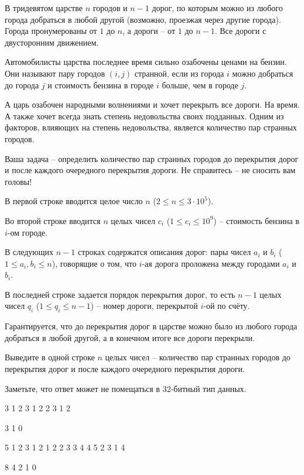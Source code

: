 
В тридевятом царстве $n$ городов и $n - 1$ дорог, по которым можно из любого города добраться в любой другой (возможно, проезжая через другие города). Города пронумерованы от $1$ до $n$, а дороги -- от $1$ до $n - 1$. Все дороги с двусторонним движением.

Автомобилисты царства последнее время сильно озабочены ценами на бензин. Они называют пару городов $(i, j)$ странной, если из города $i$ можно добраться до города $j$ и стоимость бензина в городе $i$ больше, чем в городе $j$.

А царь озабочен народными волнениями и хочет перекрыть все дороги. На время. А также хочет всегда знать степень недовольства своих подданных. Одним из факторов, влияющих на степень недовольства, является количество пар странных городов.

Ваша задача -- определить количество пар странных городов до перекрытия дорог и после каждого очередного перекрытия дороги. Не справитесь -- не сносить вам головы!


В первой строке вводится целое число $n$ ($2 \le n \le 3 \cdot 10^5$).

Во второй строке вводится $n$ целых чисел $c_i$ ($1 \le c_i \le 10^9$) -- стоимость бензина в $i$-ом городе.

В следующих $n - 1$ строках содержатся описания дорог: пары чисел $a_i$ и $b_i$ ($1 \le a_i, b_i \le n$), говорящие о том, что $i$-ая дорога проложена между городами $a_i$ и $b_i$.

В последней строке задается порядок перекрытия дорог, то есть $n - 1$ целых чисел $q_i$ ($1 \le q_i \le n-1$) -- номер дороги, перекрытой $i$-ой по счёту.

Гарантируется, что до перекрытия дорог в царстве можно было из любого города добраться в любой другой, а в конечном итоге все дороги перекрыли.

\outputfmtSection

Выведите в одной строке $n$ целых чисел -- количество пар странных городов до перекрытия дорог и после каждого очередного перекрытия дороги.

Заметьте, что ответ может не помещаться в 32-битный тип данных.

\exampleSection


\begin{myverbbox}[\small]{\vinput}
3
1 2 3
1 2
2 3
1 2
\end{myverbbox}
\begin{myverbbox}[\small]{\voutput}
3 1 0
\end{myverbbox}


\begin{myverbbox}[\small]{\vinput}
5
1 2 3 1 2
1 2
2 3
3 4
4 5
2 3 1 4
\end{myverbbox}
\begin{myverbbox}[\small]{\voutput}
8 4 2 1 0
\end{myverbbox}


